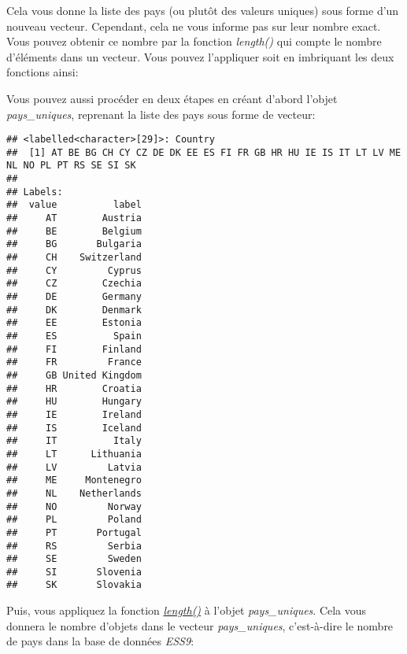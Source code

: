 \documentclass[
]{book}
\newenvironment{Shaded}{\begin{snugshade}}{\end{snugshade}}
\newcommand{\FunctionTok}[1]{\textcolor[rgb]{0.00,0.00,0.00}{#1}}
\newcommand{\NormalTok}[1]{#1}
\newcommand{\OtherTok}[1]{\textcolor[rgb]{0.56,0.35,0.01}{#1}}
\newcommand{\SpecialCharTok}[1]{\textcolor[rgb]{0.00,0.00,0.00}{#1}}
\begin{document}
Cela vous donne la liste des pays (ou plutôt des valeurs uniques) sous forme d'un nouveau vecteur. Cependant, cela ne vous informe pas sur leur nombre exact. Vous pouvez obtenir ce nombre par la fonction \emph{length()} qui compte le nombre d'éléments dans un vecteur. Vous pouvez l'appliquer soit en imbriquant les deux fonctions ainsi:

\begin{Shaded}
\end{Shaded}

Vous pouvez aussi procéder en deux étapes en créant d'abord l'objet \emph{pays\_uniques}, reprenant la liste des pays sous forme de vecteur:

\begin{Shaded}
\end{Shaded}

\begin{verbatim}
## <labelled<character>[29]>: Country
##  [1] AT BE BG CH CY CZ DE DK EE ES FI FR GB HR HU IE IS IT LT LV ME NL NO PL PT RS SE SI SK
## 
## Labels:
##  value          label
##     AT        Austria
##     BE        Belgium
##     BG       Bulgaria
##     CH    Switzerland
##     CY         Cyprus
##     CZ        Czechia
##     DE        Germany
##     DK        Denmark
##     EE        Estonia
##     ES          Spain
##     FI        Finland
##     FR         France
##     GB United Kingdom
##     HR        Croatia
##     HU        Hungary
##     IE        Ireland
##     IS        Iceland
##     IT          Italy
##     LT      Lithuania
##     LV         Latvia
##     ME     Montenegro
##     NL    Netherlands
##     NO         Norway
##     PL         Poland
##     PT       Portugal
##     RS         Serbia
##     SE         Sweden
##     SI       Slovenia
##     SK       Slovakia
\end{verbatim}

Puis, vous appliquez la fonction \emph{\href{https://www.rdocumentation.org/packages/base/versions/3.6.2/topics/length}{length()}} à l'objet \emph{pays\_uniques}. Cela vous donnera le nombre d'objets dans le vecteur \emph{pays\_uniques}, c'est-à-dire le nombre de pays dans la base de données \emph{ESS9}:
\end{document}
